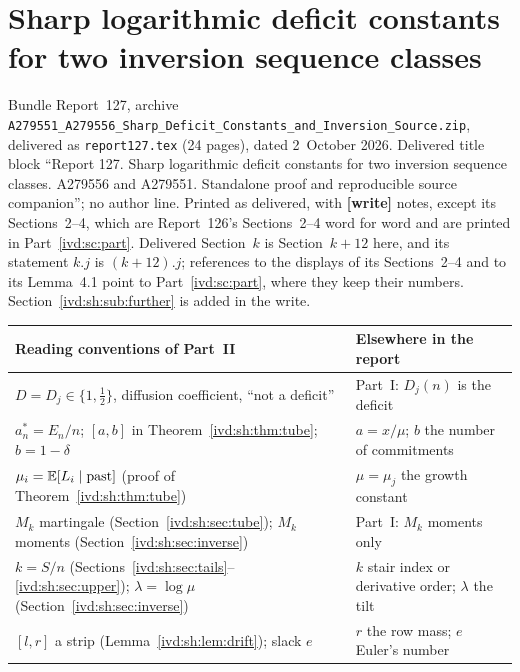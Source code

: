 \documentclass[11pt,letterpaper]{article}
\theoremstyle{remark}\newtheorem{remark}[theorem]{Remark}
\numberwithin{equation}{section}
\newcommand{\file}[1]{\nolinkurl{#1}}
\newcommand{\partsource}[1]{\par\noindent\begin{minipage}{\textwidth}\small #1\end{minipage}\par\medskip}
\begin{document}
\clearpage
\part{Sharp logarithmic deficit constants for two inversion sequence classes}\label{ivd:sh:part}
\partsource{Bundle Report~127, archive \file{A279551_A279556_Sharp_Deficit_Constants_and_Inversion_Source.zip}, delivered as \file{report127.tex} (24 pages), dated 2~October 2026. Delivered title block ``Report 127. Sharp logarithmic deficit constants for two inversion sequence classes. A279556 and A279551. Standalone proof and reproducible source companion''; no author line. Printed as delivered, with \textbf{[write]} notes, except its Sections~2--4, which are Report~126's Sections~2--4 word for word and are printed in Part~\ref{ivd:sc:part}. Delivered Section~$k$ is Section~$k+12$ here, and its statement $k.j$ is $(k+12).j$; references to the displays of its Sections~2--4 and to its Lemma~4.1 point to Part~\ref{ivd:sc:part}, where they keep their numbers. Section~\ref{ivd:sh:sub:further} is added in the write.}
\begin{center}
\small
\begin{tabular}{@{}>{\raggedright\arraybackslash}p{} >{\raggedright\arraybackslash}p{}@{}}
\toprule
Reading conventions of Part~II & Elsewhere in the report\\
\midrule
$D=D_j\in\{1,\frac12\}$, diffusion coefficient, ``not a deficit'' & Part~I: $D_j(n)$ is the deficit\\
$a_n^*=E_n/n$; $[a,b]$ in Theorem~\ref{ivd:sh:thm:tube}; $b=1-\delta$ & $a=x/\mu$; $b$ the number of commitments\\
$\mu_i=\mathbb E[L_i\mid\text{past}]$ (proof of Theorem~\ref{ivd:sh:thm:tube}) & $\mu=\mu_j$ the growth constant\\
$M_k$ martingale (Section~\ref{ivd:sh:sec:tube}); $M_k$ moments (Section~\ref{ivd:sh:sec:inverse}) & Part~I: $M_k$ moments only\\
$k=S/n$ (Sections~\ref{ivd:sh:sec:tails}--\ref{ivd:sh:sec:upper}); $\lambda=\log\mu$ (Section~\ref{ivd:sh:sec:inverse}) & $k$ stair index or derivative order; $\lambda$ the tilt\\
$[l,r]$ a strip (Lemma~\ref{ivd:sh:lem:drift}); slack $e$ & $r$ the row mass; $e$ Euler's number\\
\bottomrule
\end{tabular}
\end{center}
\end{document}
